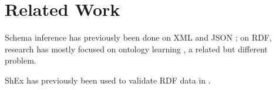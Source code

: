 \documentclass{scrartcl}
\begin{document}
\section{Related Work}

Schema inference has previously been done on XML \cite{Bex:2007:IXS:1325851.1325964} and JSON \cite{json-inference};
on RDF, research has mostly focused on ontology learning \cite{Zhou2007}, a related but different problem.

ShEx has previously been used to validate RDF data in \cite{SOLBRIG201790}.



\end{document}
